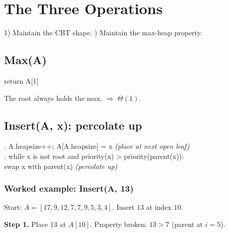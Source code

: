 \documentclass[11pt]{article}
\newcommand{\heapcoords}{\foreach \hi/\hx/\hy in {1/0/4.5,2/-2.3/3.0,3/2.3/3.0,4/-3.45/1.6,5/-1.15/1.6,6/1.15/1.6,7/3.45/1.6,8/-4.0/0.2,9/-2.9/0.2,10/-1.75/0.2}{\coordinate (p\hi) at (\hx,\hy);}}
\newcommand{\drawheap}[2]{%
  \heapcoords
  \begin{scope}[on background layer]\foreach \a/\b in {#2}{\draw[hedge] (p\a)--(p\b);}\end{scope}
  \foreach \idx/\val/\col in {#1}{%
     \node[hnode,text=\col] (n\idx) at (p\idx) {\val};
     \node[hidx] at ([shift={(-0.30,0.30)}]p\idx) {\idx};}
}
\begin{document}
\section{The Three Operations}

\begin{keybox}
1) Maintain the \textcolor{rustW}{CBT shape}. ) Maintain the \textcolor{rustW}{max-heap property}.
\end{keybox}

\subsection{Max(A)}

\begin{codebox}[Max(A)]
\ttfamily return A[1]
\end{codebox}

The root always holds the max. $\Rightarrow$ \textcolor{greenO}{$\Theta(1)$}.

\subsection{Insert(A, x): percolate up}

\begin{codebox}[Insert(A, x)]
. A.heapsize++; A[A.heapsize] = x \hfill\textnormal{\itshape (place at next open leaf)}\\[3pt]
. while x is not root and priority(x) > priority(parent(x)):\\
\ttfamily \hspace*{2em}swap x with parent(x) \hfill\textnormal{\itshape (percolate up)}
\end{codebox}

\subsubsection*{Worked example: Insert(A, 13)}
Start: $A = [17,9,12,7,7,9,5,3,4]$. Insert $13$ at index $10$.

\textbf{Step 1.} Place $13$ at $A[10]$. Property broken: $13 > 7$ (parent at $i=5$).

\begin{center}
\end{center}
\end{document}

